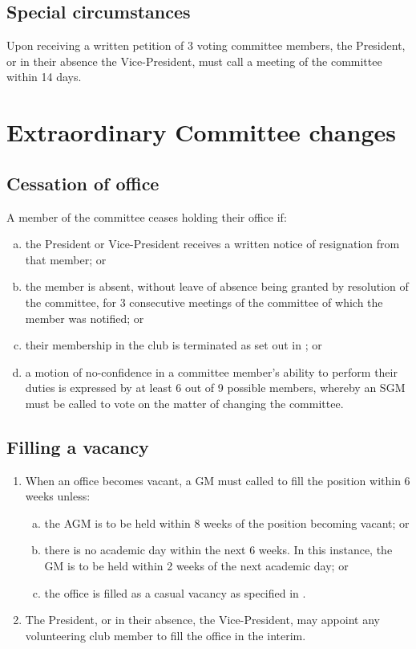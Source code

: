 \documentclass{constitution}
\begin{document}
\subsection{Special circumstances}
Upon receiving a written petition of 3 voting committee members, the President, or in their absence the Vice-President, must call a meeting of the committee within 14 days.

\section{Extraordinary Committee changes}\label{extraordinaryCommitteeChanges}
\subsection{Cessation of office}
A member of the committee ceases holding their office if:
\begin{enumerate}[(a)]
    \item the President or Vice-President receives a written notice of resignation from that member; or
    \item the member is absent, without leave of absence being granted by resolution of the committee, for 3 consecutive meetings of the committee of which the member was notified; or
    \item their membership in the club is terminated as set out in ; or
    \item a motion of no-confidence in a committee member's ability to perform their duties is expressed by at least 6 out of 9 possible members, whereby an SGM must be called to vote on the matter of changing the committee. %
\end{enumerate}

\subsection{Filling a vacancy}
\begin{enumerate}[(1)]
    \item When an office becomes vacant, a GM must called to fill the position within 6 weeks unless:
          \begin{enumerate}[(a)]
              \item the AGM is to be held within 8 weeks of the position becoming vacant; or
              \item there is no academic day within the next 6 weeks. In this instance, the GM is to be held within 2 weeks of the next academic day; or
              \item the office is filled as a casual vacancy as specified in .
          \end{enumerate}
    \item The President, or in their absence, the Vice-President, may appoint any volunteering club member to fill the office in the interim.
\end{enumerate}
\end{document}
